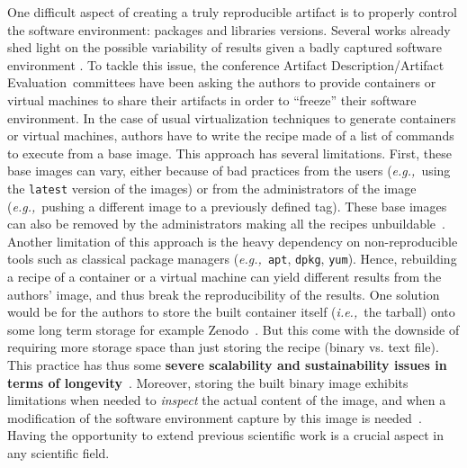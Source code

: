 \documentclass[sigconf,natbib=false]{acmart}
\newcommand{\ie}{\emph{i.e.,}}
\newcommand{\eg}{\emph{e.g.,}}
\newcommand{\ad}{Artifact Description}
\newcommand{\aeval}{Artifact Evaluation}
\newcommand{\adae}{\ad/\aeval}
\newcommand{\todo}[1]{{\color{red}{TODO: #1}}}
\begin{document}
One difficult aspect of creating a truly reproducible artifact is to properly control the software environment: packages and libraries versions.
Several works already shed light on the possible variability of results given a badly captured software environment \cite{mytkowicz_producing_nodate}.
To tackle this issue, the conference \adae\ committees have been asking the authors to provide containers or virtual machines to share their artifacts in order to ``freeze'' their software environment.
In the case of usual virtualization techniques to generate containers or virtual machines, authors have to write the recipe made of a list of commands to execute from a base image.
This approach has several limitations.
First, these base images can vary, either because of bad practices from the users (\eg\ using the \texttt{latest} version of the images) or from the administrators of the image (\eg\ pushing a different image to a previously defined tag).
These base images can also be removed by the administrators making all the recipes unbuildable~\cite{nvidia_cuda_lifetime}.
Another limitation of this approach is the heavy dependency on non-reproducible tools such as classical package managers (\eg\ \texttt{apt}, \texttt{dpkg}, \texttt{yum}).
Hence, rebuilding a recipe of a container or a virtual machine can yield different results from the authors' image, and thus break the reproducibility of the results.
One solution would be for the authors to store the built container itself (\ie\ the tarball) onto some long term storage for example Zenodo~\cite{zenodo}.
But this come with the downside of requiring more storage space than just storing the recipe (binary vs. text file).
This practice has thus some \textbf{severe scalability and sustainability issues in terms of longevity}~\cite{guilloteau2024longevity}.
Moreover, storing the built binary image exhibits limitations when needed to \emph{inspect} the actual content of the image, and when a modification of the software environment capture by this image is needed~\cite{mercier2018considering}.
Having the opportunity to extend previous scientific work is a crucial aspect in any scientific field.


\end{document}
